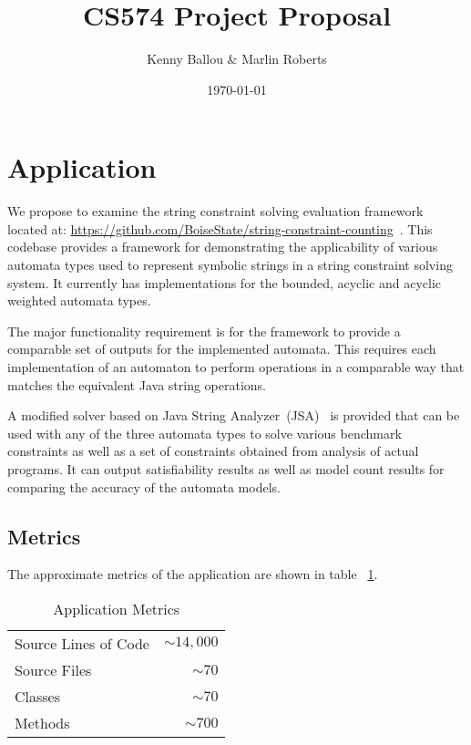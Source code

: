 \documentclass[letterpaper,11pt,twocolumn]{article}
\title{CS574 Project Proposal}
\date{\today}
\author{Kenny Ballou \& Marlin Roberts}
\begin{document}
\maketitle{}
\tableofcontents{}

\section{Application}

We propose to examine the string constraint solving evaluation framework
located at:
\url{https://github.com/BoiseState/string-constraint-counting}~\cite{Sherman_2019}.
This codebase provides a framework for demonstrating the applicability of
various automata types used to represent symbolic strings in a string
constraint solving system.  It currently has implementations for the bounded,
acyclic and acyclic weighted automata types.

The major functionality requirement is for the framework to provide a
comparable set of outputs for the implemented automata.  This requires each
implementation of an automaton to perform operations in a comparable way that
matches the equivalent Java string operations.

A modified solver based on Java String Analyzer~(JSA)~\cite{strings2003} is
provided that can be used with any of the three automata types to solve various
benchmark constraints as well as a set of constraints obtained from analysis of
actual programs.  It can output satisfiability results as well as model count
results for comparing the accuracy of the automata models.

\subsection{Metrics}

The approximate metrics of the application are shown in table
~\ref{tab:app-metrics}.


\begin{table}[ht]\label{tab:app-metrics}
  \centering
  \begin{tabular}{lr}
    \toprule
    Source Lines of Code & \(\sim14,000\) \\
    Source Files         & \(\sim70\) \\
    Classes              & \(\sim70\) \\
    Methods              & \(\sim700\) \\
    \bottomrule
  \end{tabular}
  \caption{Application Metrics}
\end{table}
\end{document}
